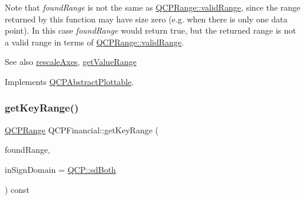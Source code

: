 Note that {\itshape found\+Range} is not the same as \hyperlink{class_q_c_p_range_ab38bd4841c77c7bb86c9eea0f142dcc0}{Q\+C\+P\+Range\+::valid\+Range}, since the range returned by this function may have size zero (e.\+g. when there is only one data point). In this case {\itshape found\+Range} would return true, but the returned range is not a valid range in terms of \hyperlink{class_q_c_p_range_ab38bd4841c77c7bb86c9eea0f142dcc0}{Q\+C\+P\+Range\+::valid\+Range}.

\begin{DoxySeeAlso}{See also}
\hyperlink{class_q_c_p_abstract_plottable_a1491c4a606bccd2d09e65e11b79eb882}{rescale\+Axes}, \hyperlink{class_q_c_p_financial_a82d862aa134d78853f98f8c57a03415b}{get\+Value\+Range} 
\end{DoxySeeAlso}


Implements \hyperlink{class_q_c_p_abstract_plottable_a4da16d3cd4b509e1104a9b0275623c96}{Q\+C\+P\+Abstract\+Plottable}.

\mbox{\label{class_q_c_p_financial_a15d68fb257113fef697356d65fa76559}} 
\subsubsection{\texorpdfstring{get\+Key\+Range()}{getKeyRange()}\hspace{0.1cm}{\footnotesize\ttfamily [2/2]}}
{\footnotesize\ttfamily \hyperlink{class_q_c_p_range}{Q\+C\+P\+Range} Q\+C\+P\+Financial\+::get\+Key\+Range (\begin{DoxyParamCaption}\item[{bool \&}]{found\+Range,  }\item[{\hyperlink{namespace_q_c_p_afd50e7cf431af385614987d8553ff8a9}{Q\+C\+P\+::\+Sign\+Domain}}]{in\+Sign\+Domain = {\ttfamily \hyperlink{namespace_q_c_p_afd50e7cf431af385614987d8553ff8a9a3dee7e9cd2fedce9253b83e172626a6c}{Q\+C\+P\+::sd\+Both}} }\end{DoxyParamCaption}) const\hspace{0.3cm}{\ttfamily [virtual]}}


